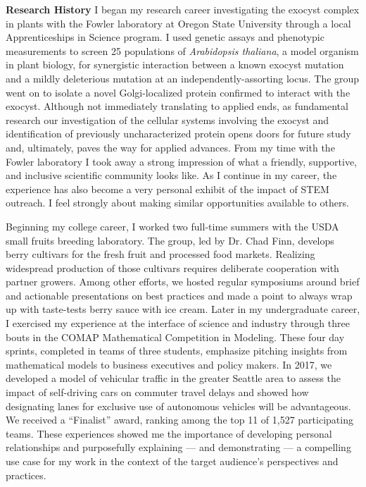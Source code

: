 \textbf{Research History}
I began my research career investigating the exocyst complex in plants with the Fowler laboratory at Oregon State University through a local Apprenticeships in Science program.
I used genetic assays and phenotypic measurements to screen 25 populations of \textit{Arabidopsis thaliana}, a model organism in plant biology, for synergistic interaction between a known exocyst mutation and a mildly deleterious mutation at an independently-assorting locus.
The group went on to isolate a novel Golgi-localized protein confirmed to interact with the exocyst.
Although not immediately translating to applied ends, as fundamental research our investigation of the cellular systems involving the exocyst and identification of previously uncharacterized protein opens doors for future study and, ultimately, paves the way for applied advances.
From my time with the Fowler laboratory I took away a strong impression of what a friendly, supportive, and inclusive scientific community looks like.
As I continue in my career, the experience has also become a very personal exhibit of the impact of STEM outreach.
I feel strongly about making similar opportunities available to others.

Beginning my college career, I worked two full-time summers with the USDA small fruits breeding laboratory.
The group, led by Dr. Chad Finn, develops berry cultivars for the fresh fruit and processed food markets.
Realizing widespread production of those cultivars requires deliberate cooperation with partner growers.
Among other efforts, we hosted regular symposiums around brief and actionable presentations on best practices and made a point to always wrap up with taste-tests berry sauce with ice cream.
Later in my undergraduate career, I exercised my experience at the interface of science and industry through three bouts in the COMAP Mathematical Competition in Modeling.
These four day sprints, completed in teams of three students, emphasize pitching insights from mathematical models to business executives and policy makers.
In 2017, we developed a model of vehicular traffic in the greater Seattle area to assess the impact of self-driving cars on commuter travel delays and showed how designating lanes for exclusive use of autonomous vehicles will be advantageous.
We received a ``Finalist'' award, ranking among the top 11 of 1,527 participating teams.
These experiences showed me the importance of developing personal relationships and purposefully explaining --- and demonstrating --- a compelling use case for my work in the context of the target audience's perspectives and practices.

